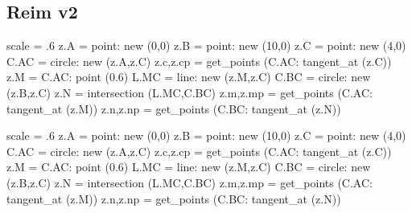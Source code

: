 \subsection{Reim v2} %
\label{sub:reim_v2}
\begin{tkzexample}[latex=0cm,small,code only]
\begin{tkzelements}
   scale    = .6
   z.A      = point: new (0,0)
   z.B      = point: new (10,0)
   z.C      = point: new (4,0)
   C.AC     = circle: new (z.A,z.C)
   z.c,z.cp = get_points (C.AC: tangent_at (z.C))
   z.M      = C.AC: point (0.6)
   L.MC     = line: new (z.M,z.C)
   C.BC     = circle: new (z.B,z.C)
   z.N      = intersection (L.MC,C.BC)
   z.m,z.mp = get_points (C.AC: tangent_at (z.M))
   z.n,z.np = get_points (C.BC: tangent_at (z.N))
\end{tkzelements}
\end{tkzexample}

\begin{tkzelements}
scale = .6
z.A     = point: new (0,0)
z.B     = point: new (10,0)
z.C     = point: new (4,0)
C.AC    = circle: new (z.A,z.C)
z.c,z.cp    = get_points (C.AC: tangent_at (z.C))
z.M      = C.AC: point (0.6)
L.MC    = line: new (z.M,z.C)
C.BC    = circle: new (z.B,z.C)
z.N     = intersection (L.MC,C.BC)
z.m,z.mp    = get_points (C.AC: tangent_at (z.M))
z.n,z.np    = get_points (C.BC: tangent_at (z.N))
\end{tkzelements}

\hspace*{\fill}
\hspace*{\fill}

